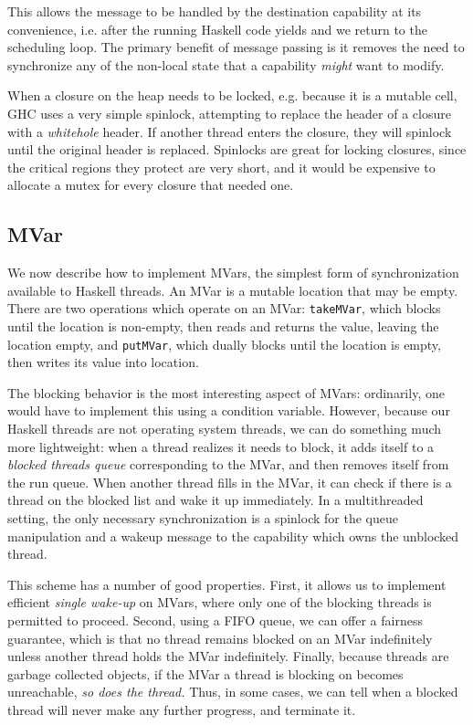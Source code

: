 This allows the message to be handled by the destination capability at
its convenience, i.e. after the running Haskell code yields and we
return to the scheduling loop.  The primary benefit of message passing
is it removes the need to synchronize any of the non-local state that a
capability \emph{might} want to modify. 

When a closure on the heap needs to be locked, e.g. because it is a
mutable cell, GHC uses a very simple spinlock, attempting to replace the
header of a closure with a \emph{whitehole} header.  If another thread
enters the closure, they will spinlock until the original header is
replaced. 
Spinlocks are great for locking closures, since the critical regions
they protect are very short, and it would be expensive to allocate a
mutex for every closure that needed one.

\subsection{MVar}

We now describe how to implement MVars, the simplest form of
synchronization available to Haskell threads.  An MVar is a mutable
location that may be empty.  There are two operations which operate on
an MVar: \verb|takeMVar|, which blocks until the location is non-empty,
then reads and returns the value, leaving the location empty, and
\verb|putMVar|, which dually blocks until the location is empty, then
writes its value into location.

The blocking behavior is the most interesting aspect of MVars:
ordinarily, one would have to implement this using a condition variable.
However, because our Haskell threads are not operating system threads,
we can do something much more lightweight: when a thread realizes it
needs to block, it adds itself to a \emph{blocked threads queue}
corresponding to the MVar, and then removes itself from the run queue.
When another thread fills in the MVar, it can check if there is a thread
on the blocked list and wake it up immediately.  In a multithreaded
setting, the only necessary synchronization is a spinlock for the queue
manipulation and a wakeup message to the capability which owns the
unblocked thread.

This scheme has a number of good properties.  First, it allows us
to implement efficient \emph{single wake-up} on MVars, where only one of
the blocking threads is permitted to proceed. Second, using a FIFO
queue, we can offer a fairness guarantee, which is that no thread
remains blocked on an MVar indefinitely unless another thread holds the
MVar indefinitely.  Finally, because threads are garbage collected
objects, if the MVar a thread is blocking on becomes unreachable,
\emph{so does the thread.}  Thus, in some cases, we can tell when
a blocked thread will never make any further progress, and terminate it.

